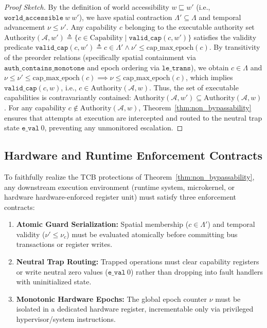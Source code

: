 \begin{proof}[Proof Sketch]
By the definition of world accessibility $w \sqsubseteq w'$ (i.e., $\mathtt{world\_accessible}~w~w'$), we have spatial contraction $\Lambda' \subseteq \Lambda$ and temporal advancement $\nu \le \nu'$. Any capability $c$ belonging to the executable authority set $\text{Authority}(\mathcal{A}, w') \triangleq \{ c \in \text{Capability} \mid \mathtt{valid\_cap}(c, w') \}$ satisfies the validity predicate $\mathtt{valid\_cap}(c, w') \triangleq c \in \Lambda' \land \nu' \le \text{cap\_max\_epoch}(c)$. By transitivity of the preorder relations (specifically spatial containment via $\mathtt{auth\_contains\_monotone}$ and epoch ordering via $\mathtt{le\_trans}$), we obtain $c \in \Lambda$ and $\nu \le \nu' \le \text{cap\_max\_epoch}(c) \implies \nu \le \text{cap\_max\_epoch}(c)$, which implies $\mathtt{valid\_cap}(c, w)$, i.e., $c \in \text{Authority}(\mathcal{A}, w)$. Thus, the set of executable capabilities is contravariantly contained: $\text{Authority}(\mathcal{A}, w') \subseteq \text{Authority}(\mathcal{A}, w)$. For any capability $c \notin \text{Authority}(\mathcal{A}, w)$, Theorem~\ref{thm:non_bypassability} ensures that attempts at execution are intercepted and routed to the neutral trap state $\mathtt{e\_val}~0$, preventing any unmonitored escalation.
\end{proof}

\subsection{Hardware and Runtime Enforcement Contracts}

To faithfully realize the TCB protections of Theorem~\ref{thm:non_bypassability}, any downstream execution environment (runtime system, microkernel, or hardware hardware-enforced register unit) must satisfy three enforcement contracts:

\begin{enumerate}
    \item \textbf{Atomic Guard Serialization:} Spatial membership ($c \in \Lambda'$) and temporal validity ($\nu' \le \nu_c$) must be evaluated atomically before committing bus transactions or register writes.
    \item \textbf{Neutral Trap Routing:} Trapped operations must clear capability registers or write neutral zero values ($\mathtt{e\_val}~0$) rather than dropping into fault handlers with uninitialized state.
    \item \textbf{Monotonic Hardware Epochs:} The global epoch counter $\nu$ must be isolated in a dedicated hardware register, incrementable only via privileged hypervisor/system instructions.
\end{enumerate}

